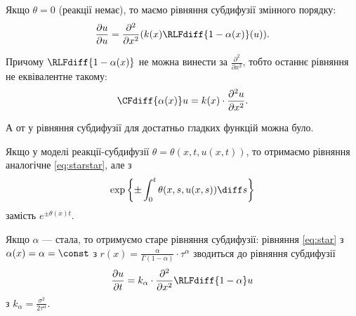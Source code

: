 Якщо $\theta = 0$ (реакції немає), то маємо рівняння субдифузії змінного порядку:
\begin{equation}
    \label{eq:star}
    \frac{\partial u}{\partial u} = \frac{\partial^2}{\partial x^2} ( k(x) \RLFdiff{1 - \alpha(x)}(u) ).
\end{equation}

\begin{remark}
    Причому $\RLFdiff{1 - \alpha(x)}$ не можна винести за $\frac{\partial^2}{\partial x^2}$, тобто останнє рівняння не еквівалентне такому:
    \begin{equation}
        \CFdiff{\alpha(x)} u = k(x) \cdot \frac{\partial^2 u}{\partial x^2}.
    \end{equation}
    
    А от у рівняння субдифузії для достатньо гладких функцій можна було.
\end{remark}

\begin{remark}
    Якщо у моделі реакції-субдифузії $\theta = \theta(x, t, u(x, t))$, то отримаємо рівняння аналогічне \eqref{eq:starstar}, але з
    \begin{equation}
        \exp\left\{ \pm \int_0^t \theta(x, s, u(x, s)) \diff s \right\}
    \end{equation}
    замість $e^{\pm \theta(x) t}$.
\end{remark}

\begin{remark}
    Якщо $\alpha$ --- стала, то отримуємо старе рівняння субдифузії: рівняння \eqref{eq:star} з $\alpha(x) = \alpha = \const$ з $r(x) = \frac{\alpha}{\Gamma(1 - \alpha)} \cdot \tau^\alpha$ зводиться до рівняння субдифузії
    \begin{equation}
        \frac{\partial u}{\partial t} = k_\alpha \cdot \frac{\partial^2}{\partial x^2} \RLFdiff{1 - \alpha} u     
    \end{equation} 
    з $k_\alpha = \frac{\sigma^2}{2 \tau^\alpha}$.
\end{remark}
